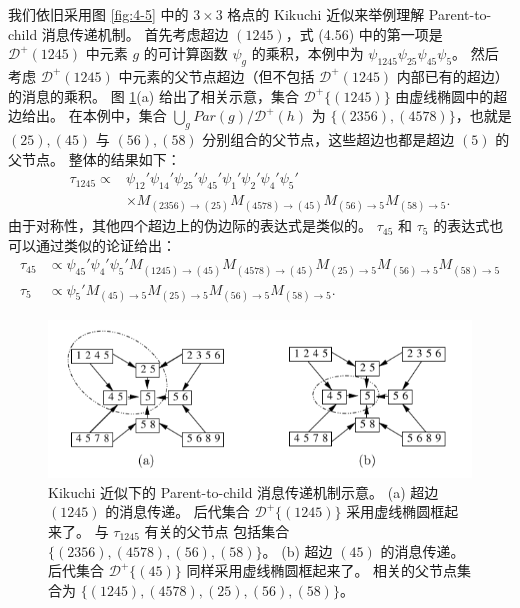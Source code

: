 \begin{tcolorbox}
\begin{exam}

我们依旧采用图 \ref{fig:4-5} 中的 $3 \times 3$ 格点的 Kikuchi 近似来举例理解 Parent-to-child 消息传递机制。
首先考虑超边 $(1245)$，式 (4.56) 中的第一项是 $\mathcal{D}^+(1245)$ 中元素 $g$ 的可计算函数 $\psi_g$ 的乘积，本例中为 $\psi_{1245}\psi_{25}\psi_{45}\psi_5$。
然后考虑 $\mathcal{D}^+(1245)$ 中元素的父节点超边（但不包括 $\mathcal{D}^+(1245)$ 内部已有的超边）的消息的乘积。
图 \ref{fig:4-6}(a) 给出了相关示意，集合 $\mathcal{D}^+\{(1245)\}$ 由虚线椭圆中的超边给出。
在本例中，集合 $\bigcup_gPar(g)/\mathcal{D}^+(h)$ 为 $\{(2356), (4578)\}$，也就是 $(25), (45)$ 与 $(56), (58)$ 分别组合的父节点，这些超边也都是超边 $(5)$ 的父节点。
整体的结果如下：
\begin{align*}
    \tau_{1245} \propto &\psi_{12}'\psi_{14}'\psi_{25}'\psi_{45}'\psi_1'\psi_2'\psi_4'\psi_5' \\
    &\times M_{(2356)\rightarrow(25)}M_{(4578)\rightarrow(45)}M_{(56)\rightarrow 5}M_{(58)\rightarrow 5}.
\end{align*}
由于对称性，其他四个超边上的伪边际的表达式是类似的。
$\tau_{45}$ 和 $\tau_5$ 的表达式也可以通过类似的论证给出：
\begin{align*}
    \tau_{45} &\propto \psi_{45}'\psi_4'\psi_5'M_{(1245)\rightarrow(45)}M_{(4578)\rightarrow(45)}M_{(25)\rightarrow 5}M_{(56)\rightarrow 5}M_{(58)\rightarrow 5} \\
    \tau_5 &\propto \psi_5'M_{(45)\rightarrow 5}M_{(25)\rightarrow 5}M_{(56)\rightarrow 5}M_{(58)\rightarrow 5}.
\end{align*}

\end{exam}
\end{tcolorbox}

\begin{figure}[htbp]
    \centering
    \includegraphics[width=.9\linewidth]{figure/4-6.PNG}
    \caption{
        Kikuchi 近似下的 Parent-to-child 消息传递机制示意。
        (a) 超边 $(1245)$ 的消息传递。
        后代集合 $\mathcal{D}^+\{(1245)\}$ 采用虚线椭圆框起来了。
        与 $\tau_{1245}$ 有关的父节点 包括集合 $\{(2356), (4578), (56), (58)\}$。
        (b) 超边 $(45)$ 的消息传递。
        后代集合 $\mathcal{D}^+\{(45)\}$ 同样采用虚线椭圆框起来了。
        相关的父节点集合为 $\{(1245), (4578), (25), (56), (58)\}$。
    }\label{fig:4-6}
\end{figure}

